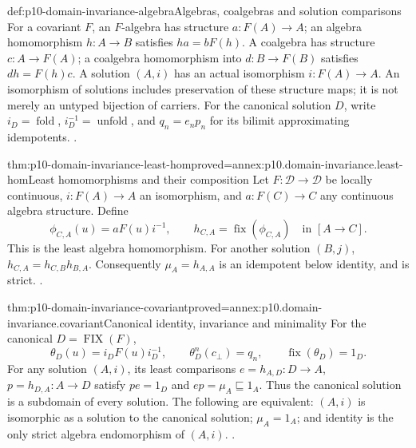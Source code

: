 \begin{hbdefinition}{def:p10-domain-invariance-algebra}{Algebras, coalgebras and solution comparisons}
For a covariant \(F\), an \(F\)-algebra has structure
\(a:F(A)\to A\); an algebra homomorphism \(h:A\to B\)
satisfies \(ha=bF(h)\). A coalgebra has structure
\(c:A\to F(A)\); a coalgebra homomorphism into
\(d:B\to F(B)\) satisfies \(dh=F(h)c\).
A solution \((A,i)\) has an actual isomorphism \(i:F(A)\to A\).
An isomorphism of solutions includes preservation of these structure
maps; it is not merely an untyped bijection of carriers.
For the canonical solution \(D\), write
\(i_D=\operatorname{fold}\), \(i_D^{-1}=\operatorname{unfold}\),
and \(q_n=e_np_n\) for its bilimit approximating idempotents.
\cite[Definition~5.1.1; pp.~69--70,74--77]
{AbramskyJungCorrectedExpandedDomainTheory}.
\end{hbdefinition}

\begin{hbtheorem}{thm:p10-domain-invariance-least-hom}{proved=annex:p10.domain-invariance.least-hom}{Least homomorphisms and their composition}
Let \(F:\mathcal D\to\mathcal D\) be locally continuous,
\(i:F(A)\to A\) an isomorphism, and \(a:F(C)\to C\)
any continuous algebra structure. Define
\[
 \phi_{C,A}(u)=aF(u)i^{-1},\qquad
 h_{C,A}=\operatorname{fix}(\phi_{C,A})
                       \quad\text{in }[A\longrightarrow C].
\]
This is the least algebra homomorphism. For another solution \((B,j)\),
\(h_{C,A}=h_{C,B}h_{B,A}\). Consequently
\(\mu_A=h_{A,A}\) is an idempotent below identity, and is strict.
\cite[Lemma~5.3.1, pp.~74--75]
{AbramskyJungCorrectedExpandedDomainTheory}.
\end{hbtheorem}

\begin{hbtheorem}{thm:p10-domain-invariance-covariant}{proved=annex:p10.domain-invariance.covariant}{Canonical identity, invariance and minimality}
For the canonical \(D=\operatorname{FIX}(F)\),
\[
 \theta_D(u)=i_DF(u)i_D^{-1},\qquad
 \theta_D^n(c_{\bot})=q_n,\qquad
 \operatorname{fix}(\theta_D)=1_D.
\]
For any solution \((A,i)\), its least comparisons
\(e=h_{A,D}:D\to A\), \(p=h_{D,A}:A\to D\)
satisfy \(pe=1_D\) and \(ep=\mu_A\sqsubseteq1_A\).
Thus the canonical solution is a subdomain of every solution.
The following are equivalent: \((A,i)\) is isomorphic as a solution
to the canonical solution; \(\mu_A=1_A\); and identity is the
only strict algebra endomorphism of \((A,i)\).
\cite[Theorems~5.3.2--3, pp.~75--76]
{AbramskyJungCorrectedExpandedDomainTheory}.
\end{hbtheorem}

